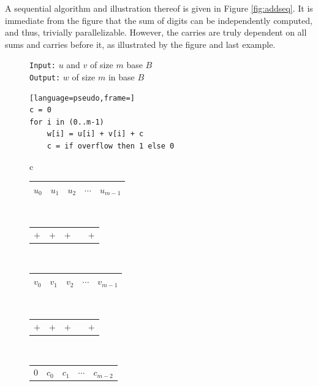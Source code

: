A sequential algorithm and illustration thereof is given in Figure
\ref{fig:addseq}. It is immediate from the figure that the sum of digits can be
independently computed, and thus, trivially parallelizable. However, the carries
are truly dependent on all sums and carries before it, as illustrated by the
figure and last example.

\begin{figure}
  \centering
  \begin{minipage}{0.45\textwidth}
    \small
    \texttt{Input:} $u$ and $v$ of size $m$ base $B$\\
    \texttt{Output:} $w$ of size $m$ in base $B$
\begin{lstlisting}[language=pseudo,frame=]
c = 0
for i in (0..m-1)
    w[i] = u[i] + v[i] + c
    c = if overflow then 1 else 0
\end{lstlisting}
  \end{minipage}
  \begin{minipage}{0.45\textwidth}
    \centering
    \footnotesize
    \begin{tabular}{c}
      \begin{tabular}{|C{0.7cm}|C{0.7cm}|C{0.7cm}|C{0.7cm}|C{0.7cm}|}
        \hline
        $u_0$ & $u_1$ & $u_2$ & $\cdots$ & $u_{m-1}$\\ 
        \hline
      \end{tabular}\\
      \begin{tabular}{C{0.7cm}C{0.7cm}C{0.7cm}C{0.7cm}C{0.7cm}}
        $+$ & $+$ & $+$ & & $+$\\ 
      \end{tabular}\\
      \begin{tabular}{|C{0.7cm}|C{0.7cm}|C{0.7cm}|C{0.7cm}|C{0.7cm}|}
        \hline
        $v_0$ & $v_1$ & $v_2$ & $\cdots$ & $v_{m-1}$\\
        \hline
      \end{tabular}\\
      \begin{tabular}{C{0.7cm}C{0.7cm}C{0.7cm}C{0.7cm}C{0.7cm}}
        $+$ & $+$ & $+$ &  & $+$\\
      \end{tabular}\\
      \begin{tabular}{C{0.7cm}C{0.7cm}C{0.7cm}C{0.7cm}C{0.7cm}}
        $0$ & $c_0$ &  $c_1$ & $\cdots$ &$c_{m-2}$ \\
      \end{tabular}\\[-0.8ex]

\end{tabular}
\end{minipage}
\end{figure}

